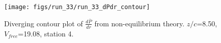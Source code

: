 \begin{figure}[H]
\centering
\texttt{[image: figs/run\_33/run\_33\_dPdr\_contour]}
\caption{Diverging contour plot of $\frac{d\bar{P}}{dr}$ from non-equilibrium theory. $z/c$=8.50, $V_{free}$=19.08, station 4.}
\label{fig:run_33_dPdr_contour}
\end{figure}



